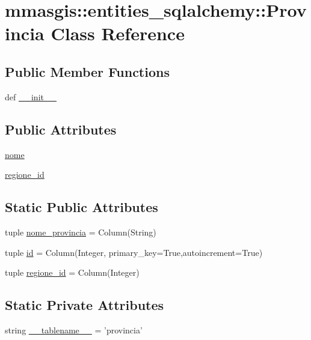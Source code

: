 \hypertarget{classmmasgis_1_1entities__sqlalchemy_1_1Provincia}{
\section{mmasgis::entities\_\-sqlalchemy::Provincia Class Reference}
\label{classmmasgis_1_1entities__sqlalchemy_1_1Provincia}
}
\subsection*{Public Member Functions}
\begin{DoxyCompactItemize}
\item 
def \hyperlink{classmmasgis_1_1entities__sqlalchemy_1_1Provincia_ace6f5a74e5a93de87ec15e7ff183efe9}{\_\-\_\-init\_\-\_\-}
\end{DoxyCompactItemize}
\subsection*{Public Attributes}
\begin{DoxyCompactItemize}
\item 
\hyperlink{classmmasgis_1_1entities__sqlalchemy_1_1Provincia_ac09cbc29b113cbdcd1f619816452e073}{nome}
\item 
\hyperlink{classmmasgis_1_1entities__sqlalchemy_1_1Provincia_ae9115b62bb12c07ef67033c45739b784}{regione\_\-id}
\end{DoxyCompactItemize}
\subsection*{Static Public Attributes}
\begin{DoxyCompactItemize}
\item 
tuple \hyperlink{classmmasgis_1_1entities__sqlalchemy_1_1Provincia_aba38808735156b3c6c4d62231487dbd4}{nome\_\-provincia} = Column(String)
\item 
tuple \hyperlink{classmmasgis_1_1entities__sqlalchemy_1_1Provincia_aa7f40c3bba379fa8794d212d8b9afd21}{id} = Column(Integer, primary\_\-key=True,autoincrement=True)
\item 
tuple \hyperlink{classmmasgis_1_1entities__sqlalchemy_1_1Provincia_a52a3fa0f63409db8283554bfd82d50a3}{regione\_\-id} = Column(Integer)
\end{DoxyCompactItemize}
\subsection*{Static Private Attributes}
\begin{DoxyCompactItemize}
\item 
string \hyperlink{classmmasgis_1_1entities__sqlalchemy_1_1Provincia_abb505fe49dc8c6fc954d7cf67a765a4a}{\_\-\_\-tablename\_\-\_\-} = 'provincia'
\end{DoxyCompactItemize}


